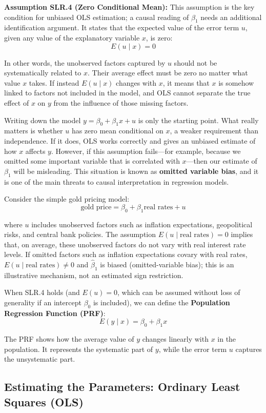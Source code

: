 \textbf{Assumption SLR.4 (Zero Conditional Mean):} This assumption is the key condition for unbiased OLS estimation; a causal reading of $\beta_1$ needs an additional identification argument. It states that the expected value of the error term $u$, given any value of the explanatory variable $x$, is zero:
$$E(u \mid x) = 0$$

In other words, the unobserved factors captured by $u$ should not be systematically related to $x$. Their average effect must be zero no matter what value $x$ takes. If instead $E(u \mid x)$ changes with $x$, it means that $x$ is somehow linked to factors not included in the model, and OLS cannot separate the true effect of $x$ on $y$ from the influence of those missing factors.

Writing down the model $y = \beta_0 + \beta_1 x + u$ is only the starting point. What really matters is whether $u$ has zero mean conditional on $x$, a weaker requirement than independence. If it does, OLS works correctly and gives an unbiased estimate of how $x$ affects $y$. However, if this assumption fails---for example, because we omitted some important variable that is correlated with $x$---then our estimate of $\beta_1$ will be misleading. This situation is known as \textbf{omitted variable bias}, and it is one of the main threats to causal interpretation in regression models.

Consider the simple gold pricing model:
$$\text{gold price} = \beta_0 + \beta_1 \text{real rates} + u$$

where $u$ includes unobserved factors such as inflation expectations, geopolitical risks, and central bank policies. The assumption $E(u \mid \text{real rates}) = 0$ implies that, on average, these unobserved factors do not vary with real interest rate levels. If omitted factors such as inflation expectations covary with real rates, $E(u\mid\text{real rates})\neq0$ and $\hat\beta_1$ is biased (omitted-variable bias); this is an illustrative mechanism, not an estimated sign restriction.

When SLR.4 holds (and $E(u) = 0$, which can be assumed without loss of generality if an intercept $\beta_0$ is included), we can define the \textbf{Population Regression Function (PRF)}:
$$E(y \mid x) = \beta_0 + \beta_1 x$$

The PRF shows how the average value of $y$ changes linearly with $x$ in the population. It represents the systematic part of $y$, while the error term $u$ captures the unsystematic part.
\subsection{Estimating the Parameters: Ordinary Least Squares (OLS)}

